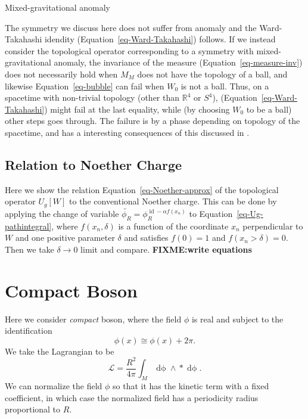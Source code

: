 \documentclass[11pt,toc=bibliography]{scrbook}
\DeclareMathOperator{\id}{id}
\numberwithin{equation}{section}
\DeclareMathOperator{\id}{id}
\begin{document}
\begin{tip}{Mixed-gravitational anomaly}

The symmetry we discuss here does not suffer from anomaly and the
Ward-Takahashi idendity (Equation~\ref{eq-Ward-Takahashi}) follows. If
we instead consider the topological operator corresponding to a symmetry
with mixed-gravitational anomaly, the invariance of the measure
(Equation~\ref{eq-measure-inv}) does not necessarily hold when \(M_M\)
does not have the topology of a ball, and likewise
Equation~\ref{eq-bubble} can fail when \(W_0\) is not a ball. Thus, on a
spacetime with non-trivial topology (other than \(\mathbb{R}^4\) or
\(S^4\)), (Equation~\ref{eq-Ward-Takahashi}) might fail at the last
equality, while (by choosing \(W_0\) to be a ball) other steps goes
through. The failure is by a phase depending on topology of the
spacetime, and has a interesting consequences of this discussed in
\autocite{Cordova:2019jqi}.

\end{tip}

\section{Relation to Noether Charge}\label{relation-to-noether-charge}

Here we show the relation Equation~\ref{eq-Noether-approx} of the
topological operator \(U_g[W]\) to the conventional Noether charge. This
can be done by applying the change of variable
\(\widetilde{\phi_R} = \phi^{\id - \alpha f(x_n)}_R\) to
Equation~\ref{eq-Ug-pathintegral}, where \(f(x_n,\delta)\) is a function
of the coordinate \(x_n\) perpendicular to \(W\) and one positive
parameter \(\delta\) and satisfies \(f(0) = 1\) and
\(f(x_n>\delta) =0\). Then we take \(\delta\to 0\) limit and compare.
\textbf{FIXME:write equations}


\chapter{Compact Boson}\label{sec-compact-boson}

Here we consider \emph{compact} boson, where the field \(\phi\) is real
and subject to the identification \[
\phi(x) \cong \phi(x) + 2\pi.
\] We take the Lagrangian to be \[
\mathcal{L} = \frac{R^2}{4\pi}\int_M \mathop{d\phi} \wedge \mathop{*}\mathop{d\phi}.
\] We can normalize the field \(\phi\) so that it has the kinetic term
with a fixed coefficient, in which case the normalized field has a
periodicity radius proportional to \(R\).
\end{document}
